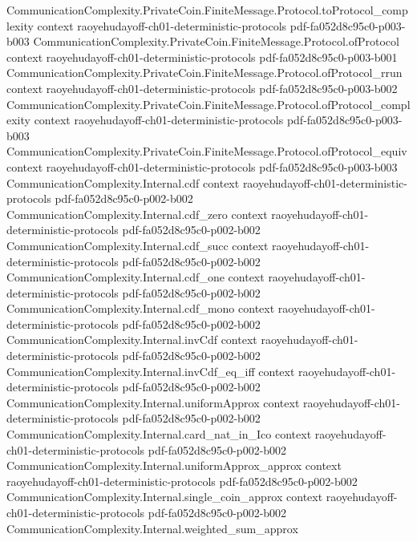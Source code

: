 \begin{theorem}
  {CommunicationComplexity.PrivateCoin.FiniteMessage.Protocol.toProtocol_complexity}
  {context}
  {raoyehudayoff-ch01-deterministic-protocols}
  {pdf-fa052d8c95c0-p003-b003}
\proofstep
  {CommunicationComplexity.PrivateCoin.FiniteMessage.Protocol.ofProtocol}
  {context}
  {raoyehudayoff-ch01-deterministic-protocols}
  {pdf-fa052d8c95c0-p003-b001}
\proofstep
  {CommunicationComplexity.PrivateCoin.FiniteMessage.Protocol.ofProtocol_rrun}
  {context}
  {raoyehudayoff-ch01-deterministic-protocols}
  {pdf-fa052d8c95c0-p003-b002}
\proofstep
  {CommunicationComplexity.PrivateCoin.FiniteMessage.Protocol.ofProtocol_complexity}
  {context}
  {raoyehudayoff-ch01-deterministic-protocols}
  {pdf-fa052d8c95c0-p003-b003}
\proofstep
  {CommunicationComplexity.PrivateCoin.FiniteMessage.Protocol.ofProtocol_equiv}
  {context}
  {raoyehudayoff-ch01-deterministic-protocols}
  {pdf-fa052d8c95c0-p003-b003}
\proofstep
  {CommunicationComplexity.Internal.cdf}
  {context}
  {raoyehudayoff-ch01-deterministic-protocols}
  {pdf-fa052d8c95c0-p002-b002}
\proofstep
  {CommunicationComplexity.Internal.cdf_zero}
  {context}
  {raoyehudayoff-ch01-deterministic-protocols}
  {pdf-fa052d8c95c0-p002-b002}
\proofstep
  {CommunicationComplexity.Internal.cdf_succ}
  {context}
  {raoyehudayoff-ch01-deterministic-protocols}
  {pdf-fa052d8c95c0-p002-b002}
\proofstep
  {CommunicationComplexity.Internal.cdf_one}
  {context}
  {raoyehudayoff-ch01-deterministic-protocols}
  {pdf-fa052d8c95c0-p002-b002}
\proofstep
  {CommunicationComplexity.Internal.cdf_mono}
  {context}
  {raoyehudayoff-ch01-deterministic-protocols}
  {pdf-fa052d8c95c0-p002-b002}
\proofstep
  {CommunicationComplexity.Internal.invCdf}
  {context}
  {raoyehudayoff-ch01-deterministic-protocols}
  {pdf-fa052d8c95c0-p002-b002}
\proofstep
  {CommunicationComplexity.Internal.invCdf_eq_iff}
  {context}
  {raoyehudayoff-ch01-deterministic-protocols}
  {pdf-fa052d8c95c0-p002-b002}
\proofstep
  {CommunicationComplexity.Internal.uniformApprox}
  {context}
  {raoyehudayoff-ch01-deterministic-protocols}
  {pdf-fa052d8c95c0-p002-b002}
\proofstep
  {CommunicationComplexity.Internal.card_nat_in_Ico}
  {context}
  {raoyehudayoff-ch01-deterministic-protocols}
  {pdf-fa052d8c95c0-p002-b002}
\proofstep
  {CommunicationComplexity.Internal.uniformApprox_approx}
  {context}
  {raoyehudayoff-ch01-deterministic-protocols}
  {pdf-fa052d8c95c0-p002-b002}
\proofstep
  {CommunicationComplexity.Internal.single_coin_approx}
  {context}
  {raoyehudayoff-ch01-deterministic-protocols}
  {pdf-fa052d8c95c0-p002-b002}
\proofstep
  {CommunicationComplexity.Internal.weighted_sum_approx}

\end{theorem}
